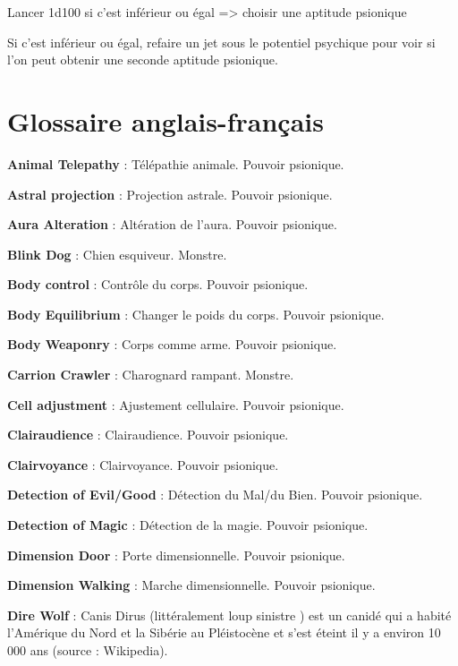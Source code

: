 \documentclass[11pt]{article}
\begin{document}
{Lancer 1d100 si c'est inférieur ou égal => choisir une aptitude psionique

Si c'est inférieur ou égal, refaire un jet sous le potentiel psychique pour voir si l'on peut obtenir une seconde aptitude psionique.





\newpage
\section*{Glossaire anglais-français }

{\parindent0cm

\textbf{Animal Telepathy} : Télépathie animale. Pouvoir psionique.

\textbf{Astral projection} : Projection astrale. Pouvoir psionique.

\textbf{Aura Alteration} : Altération de l'aura. Pouvoir psionique.

\textbf{Blink Dog} : Chien esquiveur. Monstre.

\textbf{Body control} : Contrôle du corps. Pouvoir psionique.

\textbf{Body Equilibrium} : Changer le poids du corps. Pouvoir psionique.

\textbf{Body Weaponry} : Corps comme arme. Pouvoir psionique.

\textbf{Carrion Crawler} : Charognard rampant. Monstre.

\textbf{Cell adjustment} : Ajustement cellulaire. Pouvoir psionique.

\textbf{Clairaudience} : Clairaudience. Pouvoir psionique.

\textbf{Clairvoyance} : Clairvoyance. Pouvoir psionique.

\textbf{Detection of Evil/Good} : Détection du Mal/du Bien. Pouvoir psionique.

\textbf{Detection of Magic} : Détection de la magie. Pouvoir psionique.

\textbf{Dimension Door} : Porte dimensionnelle. Pouvoir psionique.

\textbf{Dimension Walking} : Marche dimensionnelle. Pouvoir psionique.

\textbf{Dire Wolf} : Canis Dirus (littéralement \og loup sinistre \fg) est un canidé qui a habité l'Amérique du Nord et la Sibérie au Pléistocène et s’est éteint il y a environ 10 000 ans (source : Wikipedia).

}}
\end{document}

